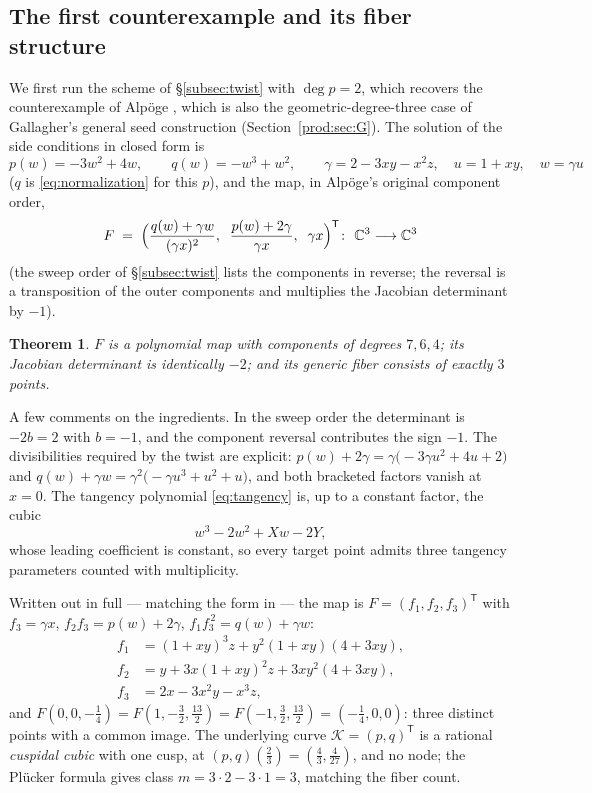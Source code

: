 \documentclass[11pt]{article}
\numberwithin{equation}{section}
\theoremstyle{plain}
\newtheorem{theorem}{Theorem}[section]
\theoremstyle{definition}
\theoremstyle{remark}
\newcommand{\C}{\mathbb{C}}
\begin{document}
\subsection{The first counterexample and its fiber structure}\label{sec:first}

We first run the scheme of \S\ref{subsec:twist} with $\deg p=2$, which recovers
the counterexample of Alp\"oge \cite{Alpoge2026}, which is also the
geometric-degree-three case of Gallagher's general seed construction
(Section~\ref{prod:sec:G}). The solution of the side
conditions in closed form is
\[
p(w)=-3w^2+4w,\qquad
q(w)=-w^3+w^2,\qquad
\gamma=2-3xy-x^2z,\quad u=1+xy,\quad w=\gamma u
\]
($q$ is \eqref{eq:normalization} for this $p$), and the map, in Alp\"oge's
original component order,
\[
F\;=\;\Bigl(\frac{q(w)+\gamma w}{(\gamma x)^2},\;\;
\frac{p(w)+2\gamma}{\gamma x},\;\;\gamma x\Bigr)^{\mathsf T}\colon\ \C^3\longrightarrow\C^3
\]
(the sweep order of \S\ref{subsec:twist} lists the components in reverse; the
reversal is a transposition of the outer components and multiplies the Jacobian
determinant by $-1$).

\begin{theorem}\label{thm:alpoge}
$F$ is a polynomial map with components of degrees $7,6,4$; its Jacobian
determinant is identically $-2$; and its generic fiber consists of exactly
$3$ points.
\end{theorem}

A few comments on the ingredients. In the sweep order the determinant is
$-2b=2$ with $b=-1$, and the component reversal contributes the sign $-1$.
The divisibilities required by the twist are explicit:
$p(w)+2\gamma=\gamma\bigl(-3\gamma u^2+4u+2\bigr)$ and
$q(w)+\gamma w=\gamma^2\bigl(-\gamma u^3+u^2+u\bigr)$, and both bracketed
factors vanish at $x=0$. The tangency
polynomial \eqref{eq:tangency} is, up to a constant factor, the cubic
\[
w^3-2w^2+Xw-2Y ,
\]
whose leading coefficient is constant, so every target point admits three
tangency parameters counted with multiplicity.

Written out in full --- matching the form in \cite{Speyer2026,Tao2026} --- the
map is $F=(f_1,f_2,f_3)^{\mathsf T}$ with $f_3=\gamma x$,
$f_2f_3=p(w)+2\gamma$, $f_1f_3^{\,2}=q(w)+\gamma w$:
\begin{align*}
f_1 &= (1+xy)^3 z + y^2(1+xy)(4+3xy),\\
f_2 &= y + 3x(1+xy)^2 z + 3xy^2(4+3xy),\\
f_3 &= 2x - 3x^2y - x^3 z ,
\end{align*}
and
$F(0,0,-\tfrac14)=F(1,-\tfrac32,\tfrac{13}{2})=F(-1,\tfrac32,\tfrac{13}{2})
=(-\tfrac14,0,0)$: three distinct points with a common image. The underlying
curve $\mathcal{K}=(p,q)^{\mathsf T}$ is a rational \emph{cuspidal cubic} with one cusp, at
$(p,q)(\tfrac23)=(\tfrac43,\tfrac4{27})$, and no node; the Pl\"ucker formula
gives class $m=3\cdot2-3\cdot1=3$, matching the fiber count.
\end{document}
